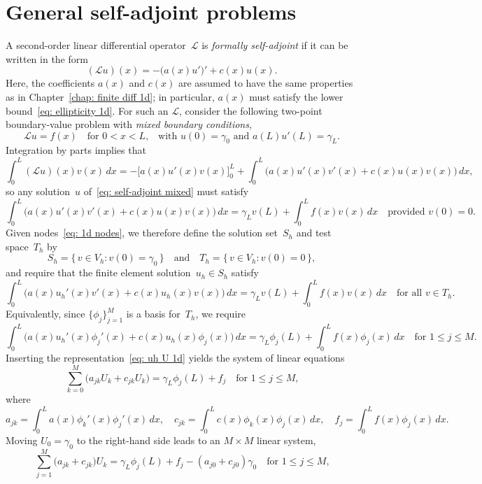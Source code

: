 \section{General self-adjoint problems}
A second-order linear differential operator~$\mathcal{L}$ is 
\emph{formally self-adjoint} if it can be written in the form
\[
(\mathcal{L}u)(x)=-\bigl(a(x)u'\bigr)'+c(x)u(x).
\]
Here, the coefficients $a(x)$ and $c(x)$ are assumed to have the same 
properties as in Chapter~\ref{chap: finite diff 1d}; in particular, $a(x)$ must 
satisfy the lower bound~\eqref{eq: ellipticity 1d}. For such an $\mathcal{L}$, 
consider the following two-point boundary-value problem with \emph{mixed 
boundary conditions},
\begin{equation}\label{eq: self-adjoint mixed}
\mathcal{L}u=f(x)\quad\text{for $0<x<L$,}\quad
\text{with $u(0)=\gamma_0$ and $a(L)u'(L)=\gamma_L$.}
\end{equation}
Integration by parts implies that
\[
\int_0^L(\mathcal{L}u)(x)v(x)\,dx
    =-\bigl[a(x)u'(x)v(x)\bigr]_0^L+\int_0^L\bigl(a(x)u'(x)v'(x)+c(x)u(x)v(x)
        \bigr)\,dx,
\]
so any solution~$u$ of~\eqref{eq: self-adjoint mixed} must satisfy
\[
\int_0^L\bigl(a(x)u'(x)v'(x)+c(x)u(x)v(x)\bigr)\,dx
    =\gamma_Lv(L)+\int_0^Lf(x)v(x)\,dx
    \quad\text{provided $v(0)=0$.}
\]
Given nodes~\eqref{eq: 1d nodes}, we therefore define the solution set~$S_h$ and 
test space~$T_h$ by
\[
S_h=\{\,v\in V_h:v(0)=\gamma_0\,\}
\quad\text{and}\quad
T_h=\{\,v\in V_h:v(0)=0\,\},
\]
and require that the finite element solution~$u_h\in S_h$ satisfy
\begin{equation}\label{eq: self-adjoint mixed bc FEM}
\int_0^L\bigl(a(x)u_h'(x)v'(x)+c(x)u_h(x)v(x)\bigr)\,dx
    =\gamma_Lv(L)+\int_0^Lf(x)v(x)\,dx
    \quad\text{for all $v\in T_h$.}
\end{equation}
Equivalently, since $\{\phi_j\}_{j=1}^M$ is a basis for~$T_h$, we require
\[
\int_0^L\bigl(a(x)u_h'(x)\phi_j'(x)+c(x)u_h(x)\phi_j(x)\bigr)\,dx
    =\gamma_L\phi_j(L)+\int_0^Lf(x)\phi_j(x)\,dx
    \quad\text{for $1\le j\le M$.}
\]
Inserting the representation~\eqref{eq: uh U 1d} yields the system of linear 
equations
\[
\sum_{k=0}^M\bigl(a_{jk}U_k+c_{jk}U_k\bigr)=\gamma_L\phi_j(L)+f_j
    \quad\text{for $1\le j\le M$,}
\]
where
\[
a_{jk}=\int_0^La(x)\phi_k'(x)\phi_j'(x)\,dx,\quad
c_{jk}=\int_0^Lc(x)\phi_k(x)\phi_j(x)\,dx,\quad
f_j=\int_0^Lf(x)\phi_j(x)\,dx.
\]
Moving $U_0=\gamma_0$ to the right-hand side leads to an $M\times M$ linear 
system,
\[
\sum_{j=1}^M\bigl(a_{jk}+c_{jk})U_k
    =\gamma_L\phi_j(L)+f_j-(a_{j0}+c_{j0})\gamma_0
    \quad\text{for $1\le j\le M$,}
\]
